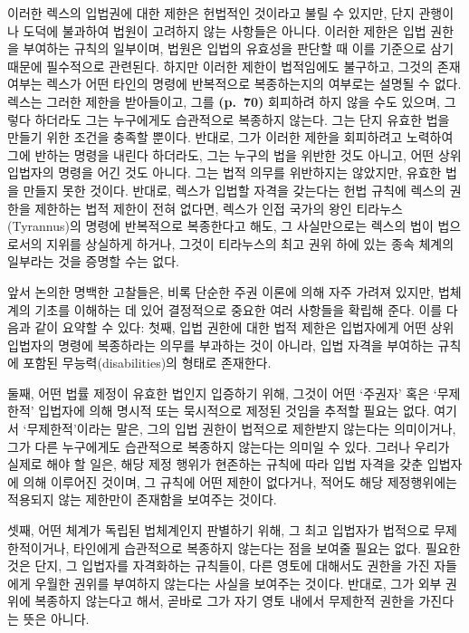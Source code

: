 이러한 렉스의 입법권에 대한 제한은 헌법적인 것이라고 불릴 수 있지만,
단지 관행이나 도덕에 불과하여 법원이 고려하지 않는 사항들은 아니다.
이러한 제한은 입법 권한을 부여하는 규칙의 일부이며, 법원은 입법의
유효성을 판단할 때 이를 기준으로 삼기 때문에 필수적으로 관련된다. 하지만
이러한 제한이 법적임에도 불구하고, 그것의 존재 여부는 렉스가 어떤 타인의
명령에 반복적으로 복종하는지의 여부로는 설명될 수 없다. 렉스는 그러한
제한을 받아들이고, 그를 \textbf{(p.~70)} 회피하려 하지 않을 수도 있으며,
그렇다 하더라도 그는 누구에게도 습관적으로 복종하지 않는다. 그는 단지
유효한 법을 만들기 위한 조건을 충족할 뿐이다. 반대로, 그가 이러한 제한을
회피하려고 노력하여 그에 반하는 명령을 내린다 하더라도, 그는 누구의 법을
위반한 것도 아니고, 어떤 상위 입법자의 명령을 어긴 것도 아니다. 그는
법적 의무를 위반하지는 않았지만, 유효한 법을 만들지 못한 것이다. 반대로,
렉스가 입법할 자격을 갖는다는 헌법 규칙에 렉스의 권한을 제한하는 법적
제한이 전혀 없다면, 렉스가 인접 국가의 왕인 티라누스(Tyrannus)의 명령에
반복적으로 복종한다고 해도, 그 사실만으로는 렉스의 법이 법으로서의
지위를 상실하게 하거나, 그것이 티라누스의 최고 권위 하에 있는 종속
체계의 일부라는 것을 증명할 수는 없다.

앞서 논의한 명백한 고찰들은, 비록 단순한 주권 이론에 의해 자주 가려져
있지만, 법체계의 기초를 이해하는 데 있어 결정적으로 중요한 여러 사항들을
확립해 준다. 이를 다음과 같이 요약할 수 있다: 첫째, 입법 권한에 대한
법적 제한은 입법자에게 어떤 상위 입법자의 명령에 복종하라는 의무를
부과하는 것이 아니라, 입법 자격을 부여하는 규칙에 포함된
무능력(disabilities)의 형태로 존재한다.

둘째, 어떤 법률 제정이 유효한 법인지 입증하기 위해, 그것이 어떤 `주권자'
혹은 `무제한적' 입법자에 의해 명시적 또는 묵시적으로 제정된 것임을
추적할 필요는 없다. 여기서 `무제한적'이라는 말은, 그의 입법 권한이
법적으로 제한받지 않는다는 의미이거나, 그가 다른 누구에게도 습관적으로
복종하지 않는다는 의미일 수 있다. 그러나 우리가 실제로 해야 할 일은,
해당 제정 행위가 현존하는 규칙에 따라 입법 자격을 갖춘 입법자에 의해
이루어진 것이며, 그 규칙에 어떤 제한이 없다거나, 적어도 해당
제정행위에는 적용되지 않는 제한만이 존재함을 보여주는 것이다.

셋째, 어떤 체계가 독립된 법체계인지 판별하기 위해, 그 최고 입법자가
법적으로 무제한적이거나, 타인에게 습관적으로 복종하지 않는다는 점을
보여줄 필요는 없다. 필요한 것은 단지, 그 입법자를 자격화하는 규칙들이,
다른 영토에 대해서도 권한을 가진 자들에게 우월한 권위를 부여하지
않는다는 사실을 보여주는 것이다. 반대로, 그가 외부 권위에 복종하지
않는다고 해서, 곧바로 그가 자기 영토 내에서 무제한적 권한을 가진다는
뜻은 아니다.

